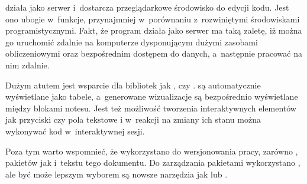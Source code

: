  działa jako serwer  i~dostarcza przeglądarkowe środowisko do edycji kodu. Jest ono
ubogie w~funkcje, przynajmniej w~porównaniu z~rozwiniętymi środowiskami programistycznymi. Fakt, że
program działa jako serwer ma taką zaletę, iż można go uruchomić zdalnie na komputerze dysponującym dużymi zasobami
obliczeniowymi oraz bezpośrednim dostępem do danych, a~następnie pracować na nim zdalnie.

Dużym atutem jest wsparcie dla bibliotek jak ,  czy .
 są automatycznie wyświetlane jako tabele, a~generowane wizualizacje są bezpośrednio wyświetlane
między blokami notesu. Jest też możliwość tworzenia interaktywnych elementów jak przyciski czy pola tekstowe i
w~reakcji na zmiany ich stanu można wykonywać kod w~interaktywnej sesji.

Poza tym warto wspomnieć, że wykorzystano  do wersjonowania pracy, zarówno , pakietów jak i~tekstu tego dokumentu. Do zarządzania pakietami wykorzystano , ale być może lepszym wyborem są nowsze narzędzia jak  lub .

